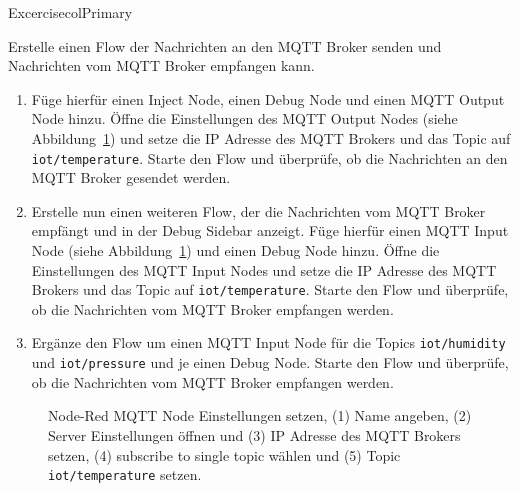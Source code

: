 \documentclass[
  11pt,
  a4paper,
  oneside, openany  ,captions=tableheading
]{scrbook}
\providecommand{\tightlist}{%
  \setlength{\itemsep}{0pt}\setlength{\parskip}{0pt}}
\theoremstyle{remark}
\begin{document}
\begin{boxtitle}{Excercise}{colPrimary}

Erstelle einen Flow der Nachrichten an den MQTT Broker senden und
Nachrichten vom MQTT Broker empfangen kann.

\begin{enumerate}
\def\labelenumi{\arabic{enumi}.}
\tightlist
\item
  Füge hierfür einen Inject Node, einen Debug Node und einen MQTT Output
  Node hinzu. Öffne die Einstellungen des MQTT Output Nodes (siehe
  Abbildung~\ref{fig-noderedmqttnodesetup}) und setze die IP Adresse des
  MQTT Brokers und das Topic auf \texttt{iot/temperature}. Starte den
  Flow und überprüfe, ob die Nachrichten an den MQTT Broker gesendet
  werden.
\item
  Erstelle nun einen weiteren Flow, der die Nachrichten vom MQTT Broker
  empfängt und in der Debug Sidebar anzeigt. Füge hierfür einen MQTT
  Input Node (siehe Abbildung~\ref{fig-noderedmqttnodesetup}) und einen
  Debug Node hinzu. Öffne die Einstellungen des MQTT Input Nodes und
  setze die IP Adresse des MQTT Brokers und das Topic auf
  \texttt{iot/temperature}. Starte den Flow und überprüfe, ob die
  Nachrichten vom MQTT Broker empfangen werden.
\item
  Ergänze den Flow um einen MQTT Input Node für die Topics
  \texttt{iot/humidity} und \texttt{iot/pressure} und je einen Debug
  Node. Starte den Flow und überprüfe, ob die Nachrichten vom MQTT
  Broker empfangen werden.
\end{enumerate}

\end{boxtitle}

\begin{figure}


\caption{\label{fig-noderedmqttnodesetup}Node-Red MQTT Node
Einstellungen setzen, (1) Name angeben, (2) Server Einstellungen öffnen
und (3) IP Adresse des MQTT Brokers setzen, (4) subscribe to single
topic wählen und (5) Topic \texttt{iot/temperature} setzen.}

\end{figure}%
\end{document}

